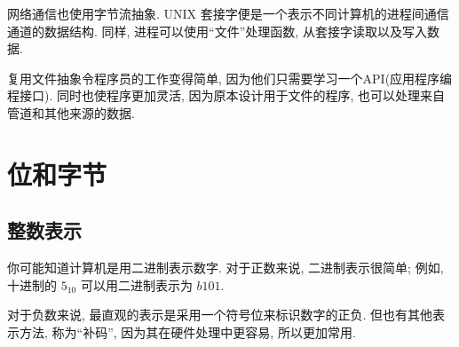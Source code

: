 \documentclass[12pt]{book}
\begin{document}
{%
网络通信也使用字节流抽象. UNIX 套接字便是一个表示不同计算机的进程间通信通道的数据结构.
同样, 进程可以使用``文件''处理函数, 从套接字读取以及写入数据.

复用文件抽象令程序员的工作变得简单, 因为他们只需要学习一个API(应用程序编程接口).
同时也使程序更加灵活, 因为原本设计用于文件的程序, 也可以处理来自管道和其他来源的数据.



\chapter{位和字节}

\section{整数表示}


你可能知道计算机是用二进制表示数字. 对于正数来说, 二进制表示很简单; 
例如, 十进制的 $5_{10}$ 可以用二进制表示为 $b101$.

对于负数来说, 最直观的表示是采用一个符号位来标识数字的正负. 但也有其他表示方法,
称为``补码'', 因为其在硬件处理中更容易, 所以更加常用.

}
\end{document}
